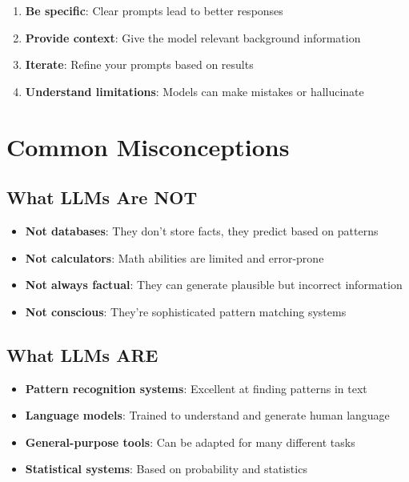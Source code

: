 \documentclass[
]{book}
\providecommand{\tightlist}{%
  \setlength{\itemsep}{0pt}\setlength{\parskip}{0pt}}
\begin{document}
\begin{enumerate}
\def\labelenumi{\arabic{enumi}.}
\tightlist
\item
  \textbf{Be specific}: Clear prompts lead to better responses
\item
  \textbf{Provide context}: Give the model relevant background information
\item
  \textbf{Iterate}: Refine your prompts based on results
\item
  \textbf{Understand limitations}: Models can make mistakes or hallucinate
\end{enumerate}

\section{Common Misconceptions}\label{common-misconceptions}

\subsection{What LLMs Are NOT}\label{what-llms-are-not}

\begin{itemize}
\tightlist
\item
  \textbf{Not databases}: They don't store facts, they predict based on patterns
\item
  \textbf{Not calculators}: Math abilities are limited and error-prone
\item
  \textbf{Not always factual}: They can generate plausible but incorrect information
\item
  \textbf{Not conscious}: They're sophisticated pattern matching systems
\end{itemize}

\subsection{What LLMs ARE}\label{what-llms-are}

\begin{itemize}
\tightlist
\item
  \textbf{Pattern recognition systems}: Excellent at finding patterns in text
\item
  \textbf{Language models}: Trained to understand and generate human language
\item
  \textbf{General-purpose tools}: Can be adapted for many different tasks
\item
  \textbf{Statistical systems}: Based on probability and statistics
\end{itemize}
\end{document}
